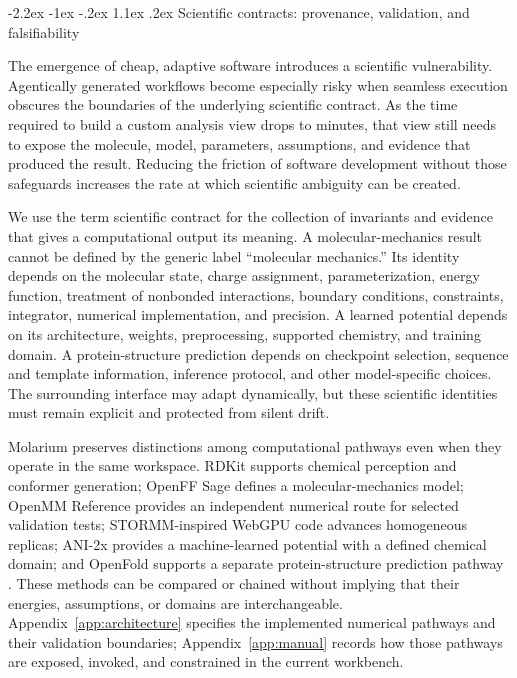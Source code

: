 \documentclass[11pt]{article}
\makeatletter
\renewcommand\section{\@startsection{section}{1}{\z@}%
  {-2.2ex \@plus -1ex \@minus -.2ex}%
  {1.1ex \@plus .2ex}%
  {\normalfont\Large\bfseries\color{molblue}}}
\makeatother
\begin{document}
\section{Scientific contracts: provenance, validation, and falsifiability}

The emergence of cheap, adaptive software introduces a scientific vulnerability. Agentically generated workflows become especially risky when seamless execution obscures the boundaries of the underlying scientific contract. As the time required to build a custom analysis view drops to minutes, that view still needs to expose the molecule, model, parameters, assumptions, and evidence that produced the result. Reducing the friction of software development without those safeguards increases the rate at which scientific ambiguity can be created.

We use the term scientific contract for the collection of invariants and evidence that gives a computational output its meaning. A molecular-mechanics result cannot be defined by the generic label ``molecular mechanics.'' Its identity depends on the molecular state, charge assignment, parameterization, energy function, treatment of nonbonded interactions, boundary conditions, constraints, integrator, numerical implementation, and precision. A learned potential depends on its architecture, weights, preprocessing, supported chemistry, and training domain. A protein-structure prediction depends on checkpoint selection, sequence and template information, inference protocol, and other model-specific choices. The surrounding interface may adapt dynamically, but these scientific identities must remain explicit and protected from silent drift.

Molarium preserves distinctions among computational pathways even when they operate in the same workspace. RDKit supports chemical perception and conformer generation; OpenFF Sage defines a molecular-mechanics model; OpenMM Reference provides an independent numerical route for selected validation tests; STORMM-inspired WebGPU code advances homogeneous replicas; ANI-2x provides a machine-learned potential with a defined chemical domain; and OpenFold supports a separate protein-structure prediction pathway \citep{riniker2015etkdg,boothroyd2023sage,eastman2024openmm8,cerutti2024stormm,devereux2020ani2x,ahdritz2024openfold}. These methods can be compared or chained without implying that their energies, assumptions, or domains are interchangeable. Appendix~\ref{app:architecture} specifies the implemented numerical pathways and their validation boundaries; Appendix~\ref{app:manual} records how those pathways are exposed, invoked, and constrained in the current workbench.
\end{document}
